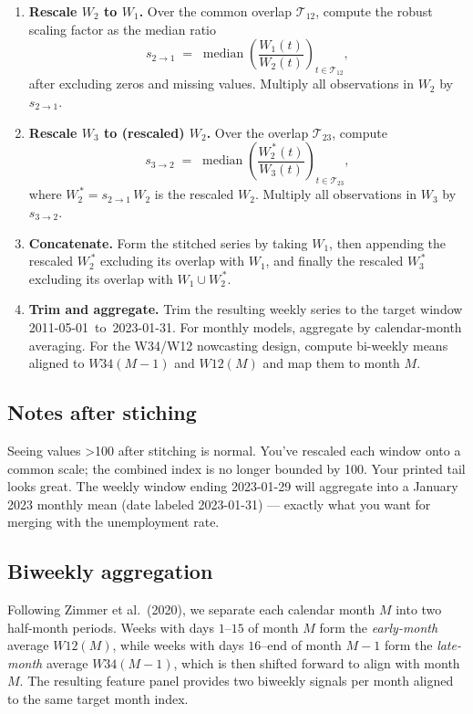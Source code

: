 \documentclass{article}
\begin{document}
\begin{enumerate}
\item \textbf{Rescale $W_2$ to $W_1$.} Over the common overlap $\mathcal{T}_{12}$, compute the robust
scaling factor as the median ratio
\[
s_{2\to 1} \;=\; \operatorname{median}\!\left( \frac{W_1(t)}{W_2(t)} \right)_{t \in \mathcal{T}_{12}},
\]
after excluding zeros and missing values. Multiply all observations in $W_2$ by $s_{2\to 1}$.

\item \textbf{Rescale $W_3$ to (rescaled) $W_2$.} Over the overlap $\mathcal{T}_{23}$, compute
\[
s_{3\to 2} \;=\; \operatorname{median}\!\left( \frac{W_2^{\,\ast}(t)}{W_3(t)} \right)_{t \in \mathcal{T}_{23}},
\]
where $W_2^{\,\ast} = s_{2\to 1}\,W_2$ is the rescaled $W_2$. Multiply all observations in $W_3$ by $s_{3\to 2}$.

\item \textbf{Concatenate.} Form the stitched series by taking $W_1$, then appending the rescaled $W_2^{\,\ast}$
excluding its overlap with $W_1$, and finally the rescaled $W_3^{\,\ast}$ excluding its overlap with
$W_1 \cup W_2^{\,\ast}$.

\item \textbf{Trim and aggregate.} Trim the resulting weekly series to the target window
\mbox{2011-05-01 to 2023-01-31}. For monthly models, aggregate by calendar-month averaging.
For the W34/W12 nowcasting design, compute bi-weekly means aligned to $W34(M-1)$ and $W12(M)$
and map them to month $M$.
\end{enumerate}

\subsection{Notes after stiching}
Seeing values >100 after stitching is normal. You’ve rescaled each window onto a common scale; the combined index is no longer bounded by 100.
Your printed tail looks great. The weekly window ending 2023-01-29 will aggregate into a January 2023 monthly mean (date labeled 2023-01-31) — exactly what you want for merging with the unemployment rate.

\subsection{Biweekly aggregation}

Following Zimmer et al.\ (2020), we separate each calendar month $M$ into two
half-month periods. Weeks with days $1\text{–}15$ of month $M$ form the
\emph{early-month} average $W12(M)$, while weeks with days $16\text{–}\text{end}$
of month $M{-}1$ form the \emph{late-month} average $W34(M{-}1)$, which is then
shifted forward to align with month $M$. The resulting feature panel provides
two biweekly signals per month aligned to the same target month index.
\end{document}
